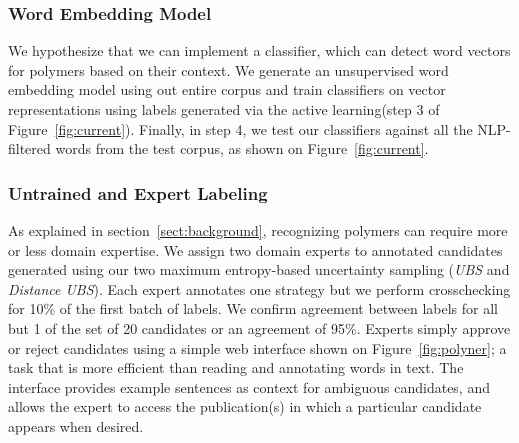 \subsubsection{Word Embedding Model}
We hypothesize that we can implement a classifier, which can detect word vectors for polymers based on their context. 
We generate an unsupervised word embedding model using out entire corpus and train classifiers on vector representations using labels generated via the active learning(step 3 of Figure~\ref{fig:current}).
Finally, in step 4, we test our classifiers against all the NLP-filtered words from the test corpus, as shown on Figure~\ref{fig:current}.

\subsubsection{Untrained and Expert Labeling}
As explained in section~\ref{sect:background}, recognizing polymers can require more or less domain expertise.
We assign two domain experts to annotated candidates generated using our two maximum entropy-based uncertainty sampling (\textit{UBS} and \textit{Distance UBS}). 
Each expert annotates one strategy but we perform crosschecking for 10\% of the first batch of labels. We confirm agreement between labels for all but 1 of the set of 20 candidates or an agreement of 95\%.
Experts simply approve or reject candidates using a simple web interface shown on Figure~\ref{fig:polyner}; a task that is more efficient than reading and annotating words in text.
The interface
provides example sentences as context for ambiguous candidates,
and allows the expert to access the publication(s) in which a particular candidate
appears when desired.


